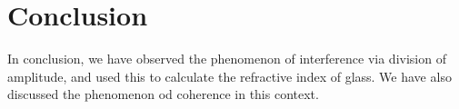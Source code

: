 \documentclass[11pt]{article}
\begin{document}
        \section{Conclusion}
        In conclusion, we have observed the phenomenon of interference via division of amplitude, and used this to calculate the refractive
        index of glass. We have also discussed the phenomenon od coherence in this context.

        \nocite{*}
        
        
\end{document}
